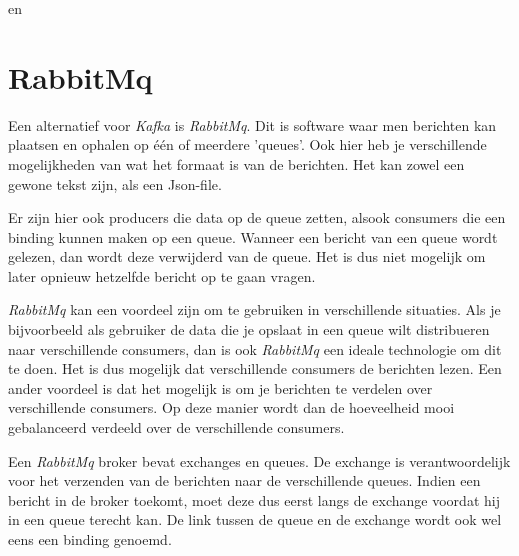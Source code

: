 \autocite{Sookocheff2015} en \autocite{Johansson2016}

\section{RabbitMq}

Een alternatief voor \emph{Kafka} is \emph{RabbitMq}. Dit is software waar men berichten kan plaatsen en ophalen op één of meerdere 'queues'. Ook hier heb je verschillende mogelijkheden van wat het formaat is van de berichten. Het kan zowel een gewone tekst zijn, als een Json-file. 

Er zijn hier ook producers die data op de queue zetten, alsook consumers die een binding kunnen maken op een queue. Wanneer een bericht van een queue wordt gelezen, dan wordt deze verwijderd van de queue. Het is dus niet mogelijk om later opnieuw hetzelfde bericht op te gaan vragen. 

\emph{RabbitMq} kan een voordeel zijn om te gebruiken in verschillende situaties. Als je bijvoorbeeld als gebruiker de data die je opslaat in een queue wilt distribueren naar verschillende consumers, dan is ook \emph{RabbitMq} een ideale technologie om dit te doen. Het is dus mogelijk dat verschillende consumers de berichten lezen. Een ander voordeel is dat het mogelijk is om je berichten te verdelen over verschillende consumers. Op deze manier wordt dan de hoeveelheid mooi gebalanceerd verdeeld over de verschillende consumers.

Een \emph{RabbitMq} broker bevat exchanges en queues. De exchange is verantwoordelijk voor het verzenden van de berichten naar de verschillende queues. Indien een bericht in de broker toekomt, moet deze dus eerst langs de exchange voordat hij in een queue terecht kan. De link tussen de queue en de exchange wordt ook wel eens een binding genoemd.

